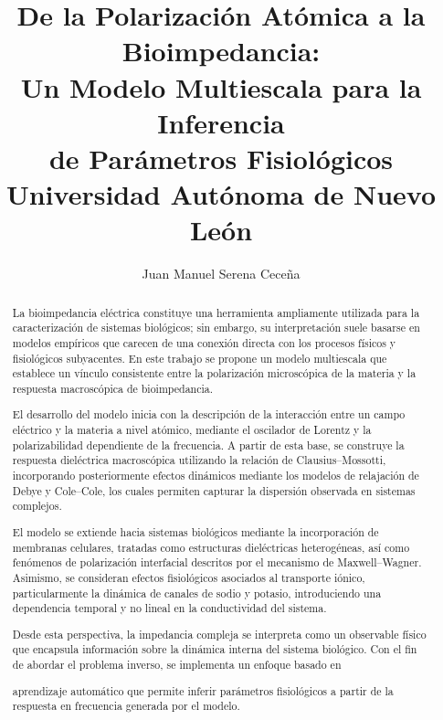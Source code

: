 \documentclass[12pt]{article}
\title{\textbf{De la Polarizaci\'on At\'omica a la Bioimpedancia:}\\
\textbf{Un Modelo Multiescala para la Inferencia}\\[0.3em]
\textbf{de Par\'ametros Fisiol\'ogicos}\\[0.5em]
\large Universidad Aut\'onoma de Nuevo Le\'on}
\author{Juan Manuel Serena Cece\~{n}a}
\date{}
\begin{document}
\maketitle

\begin{abstract}
La bioimpedancia el\'ectrica constituye una herramienta ampliamente utilizada
para la caracterizaci\'on de sistemas biol\'ogicos; sin embargo, su interpretaci\'on
suele basarse en modelos emp\'iricos que carecen de una conexi\'on directa con los
procesos f\'isicos y fisiol\'ogicos subyacentes. En este trabajo se propone un
modelo multiescala que establece un v\'inculo consistente entre la polarizaci\'on
microsc\'opica de la materia y la respuesta macrosc\'opica de bioimpedancia.

El desarrollo del modelo inicia con la descripci\'on de la interacci\'on entre un
campo el\'ectrico y la materia a nivel at\'omico, mediante el oscilador de Lorentz
y la polarizabilidad dependiente de la frecuencia. A partir de esta base, se
construye la respuesta diel\'ectrica macrosc\'opica utilizando la relaci\'on de
Clausius--Mossotti, incorporando posteriormente efectos din\'amicos mediante
los modelos de relajaci\'on de Debye y Cole--Cole, los cuales permiten capturar
la dispersi\'on observada en sistemas complejos.

El modelo se extiende hacia sistemas biol\'ogicos mediante la incorporaci\'on de
membranas celulares, tratadas como estructuras diel\'ectricas heterog\'eneas, as\'i
como fen\'omenos de polarizaci\'on interfacial descritos por el mecanismo de
Maxwell--Wagner. Asimismo, se consideran efectos fisiol\'ogicos asociados al
transporte i\'onico, particularmente la din\'amica de canales de sodio y potasio,
introduciendo una dependencia temporal y no lineal en la conductividad del sistema.

Desde esta perspectiva, la impedancia compleja se interpreta como un observable
f\'isico que encapsula informaci\'on sobre la din\'amica interna del sistema biol\'ogico.
Con el fin de abordar el problema inverso, se implementa un enfoque basado en

aprendizaje autom\'atico que permite inferir par\'ametros fisiol\'ogicos a partir de
la respuesta en frecuencia generada por el modelo.


\end{abstract}
\end{document}

